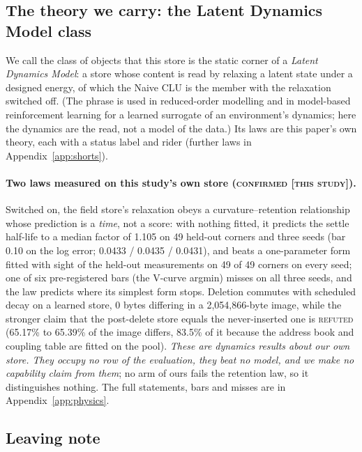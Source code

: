 \documentclass{article}
\begin{document}
\subsection{The theory we carry: the Latent Dynamics Model class}
\label{sec:theory}

We call the class of objects that this store is the static corner of a \emph{Latent Dynamics
Model}: a store whose content is read by relaxing a latent state under a designed energy, of
which the Naive CLU is the member with the relaxation switched off. (The phrase is used in
reduced-order modelling and in model-based reinforcement learning for a learned surrogate of an
environment's dynamics; here the dynamics are the read, not a model of the data.) Its laws are this paper's own theory, each with a status label and rider (further laws in Appendix~\ref{app:shorts}).

\paragraph{Two laws measured on this study's own store (\textsc{confirmed [this study]}).}
Switched on, the field store's relaxation obeys a curvature--retention relationship whose
prediction is a \emph{time}, not a score: with nothing fitted, it predicts the settle half-life to
a median factor of 1.105 on 49 held-out corners and three seeds (bar 0.10 on the log error; 0.0433
/ 0.0435 / 0.0431), and beats a one-parameter form fitted with sight of the held-out measurements
on 49 of 49 corners on every seed; one of six pre-registered bars (the V-curve argmin) misses on
all three seeds, and the law predicts where its simplest form stops.
Deletion commutes with scheduled decay on a learned store, 0 bytes differing in a 2,054,866-byte
image, while the stronger claim that the post-delete store equals the never-inserted one is
\textsc{refuted} (65.17\% to 65.39\% of the image differs, 83.5\% of it because the address book
and coupling table are fitted on the pool).
\emph{These are dynamics results about our own store. They occupy no row of the evaluation, they
beat no model, and we make no capability claim from them}; no arm of ours fails the retention law,
so it distinguishes nothing. The full statements, bars and misses are in
Appendix~\ref{app:physics}.

\subsection{Leaving note}
\label{sec:leaving}
\end{document}
